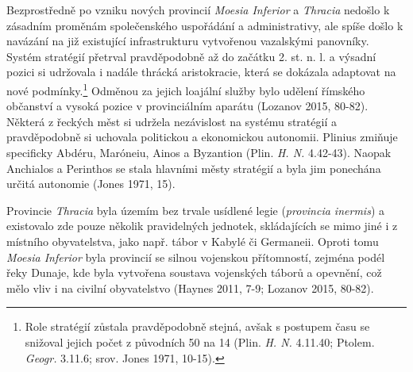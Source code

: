 Bezprostředně po vzniku nových provincií {\em Moesia Inferior} a {\em Thracia} nedošlo k zásadním proměnám společenského uspořádání a administrativy, ale spíše došlo k navázání na již existující infrastrukturu vytvořenou vazalskými panovníky. Systém stratégií přetrval pravděpodobně až do začátku 2. st. n. l. a výsadní pozici si udržovala i nadále thrácká aristokracie, která se dokázala adaptovat na nové podmínky.\footnote{Role stratégií zůstala pravděpodobně stejná, avšak s postupem času se snižoval jejich počet z původních 50 na 14 (Plin. {\em H. N.} 4.11.40; Ptolem. {\em Geogr.} 3.11.6; srov. Jones 1971, 10-15).} Odměnou za jejich loajální služby bylo udělení římského občanství a vysoká pozice v provinciálním aparátu (Lozanov 2015, 80-82). Některá z řeckých měst si udržela nezávislost na systému stratégií a pravděpodobně si uchovala politickou a ekonomickou autonomii. Plinius zmiňuje specificky Abdéru, Maróneiu, Ainos a Byzantion (Plin. {\em H. N.} 4.42-43). Naopak Anchialos a Perinthos se stala hlavními městy stratégií a byla jim ponechána určitá autonomie (Jones 1971, 15).

Provincie {\em Thracia} byla územím bez trvale usídlené legie ({\em provincia inermis}) a existovalo zde pouze několik pravidelných jednotek, skládajících se mimo jiné i z místního obyvatelstva, jako např. tábor v Kabylé či Germaneii. Oproti tomu {\em Moesia Inferior} byla provincií se silnou vojenskou přítomností, zejména podél řeky Dunaje, kde byla vytvořena soustava vojenských táborů a opevnění, což mělo vliv i na civilní obyvatelstvo (Haynes 2011, 7-9; Lozanov 2015, 80-82).

